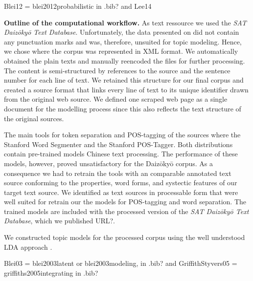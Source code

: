 \documentclass[a4paper,10pt]{article}
\newcommand{\TODO}[1]{\begingroup\color{red}#1\endgroup}
\newcommand{\NR}[1]{\begingroup\color{orange}#1\endgroup}
\begin{document}
\TODO{Blei12 = blei2012probabilistic in .bib? and Lee14}

\textbf{Outline of the computational workflow.} \NR{As text ressource we 
used the \textit{SAT Daiz{\=o}ky{\=o} Text Database}. Unfortunately, the data presented on 
\citelanguageresource{Daizokyo} did not contain any punctuation marks and was, therefore,
unsuited for topic modeling. Hence, we chose \TODO{\cite{DaiCD}} where the 
corpus was represented in XML format. We automatically obtained the plain texts and 
manually reencoded the files for further processing.} The content is semi-structured by
references to the source and the sentence number for each line of text. We
retained this structure for our final corpus and created a source format
that links every line of text to its unique identifier drawn from the
original web source. We defined one scraped web page as a single document
for the modelling process since this also reflects the text structure of
the original sources.
    
  The main tools for token separation and POS-tagging of the sources where
  the Stanford Word Segmenter and the Stanford POS-Tagger. Both
  distributions contain pre-trained models Chinese text processing. The
  performance of these models, however, proved unsatisfactory for the
  Daiz{\=o}ky{\=o} corpus. As a consequence we had to retrain the tools
  with an comparable annotated text source conforming to the properties,
  word forms, and \TODO{systectic} features of our target text source.  We
  identified \cite{Lee:12,Wong:16} as text sources in processable form that
  were well suited for retrain our the models for POS-tagging and 
  word separation. The trained models are included with the
  processed version of the \textit{SAT Daiz{\=o}ky{\=o} Text Database},
  which we published \TODO{URL?}.  

  We constructed topic models for the processed corpus using the well
  understood LDA approach \cite{Blei03,GriffithStyvers05}.
  
  \TODO{Blei03 = blei2003latent or blei2003modeling, in .bib? and GriffithStyvers05
  = griffiths2005integrating in .bib?}

\end{document}
